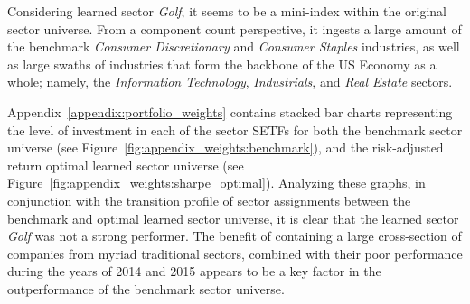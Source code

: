 \documentclass[../main.tex]{subfiles}
\begin{document}
Considering learned sector \textit{Golf}, it seems to be a mini-index within the original sector universe. From a component count perspective, it ingests a large amount of the benchmark \textit{Consumer Discretionary} and \textit{Consumer Staples} industries, as well as large swaths of industries that form the backbone of the US Economy as a whole; namely, the \textit{Information Technology}, \textit{Industrials}, and \textit{Real Estate} sectors.

Appendix~\ref{appendix:portfolio_weights} contains stacked bar charts representing the level of investment in each of the sector SETFs for both the benchmark sector universe (see Figure~\ref{fig:appendix_weights:benchmark}), and the risk-adjusted return optimal learned sector universe (see Figure~\ref{fig:appendix_weights:sharpe_optimal}). Analyzing these graphs, in conjunction with the transition profile of sector assignments between the benchmark and optimal learned sector universe, it is clear that the learned sector \textit{Golf} was not a strong performer. The benefit of containing a large cross-section of companies from myriad traditional sectors, combined with their poor performance during the years of 2014 and 2015 appears to be a key factor in the outperformance of the benchmark sector universe.
\end{document}
